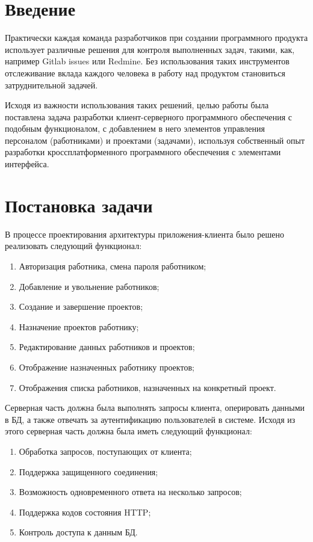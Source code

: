 \section*{Введение}
Практически каждая команда разработчиков при создании программного продукта использует различные решения для контроля выполненных задач,
такими, как, например Gitlab issues или Redmine.
Без использования таких инструментов отслеживание вклада каждого человека в работу над продуктом становиться затруднительной задачей.

Исходя из важности использования таких решений, целью работы была поставлена задача разработки клиент-серверного программного обеспечения
с подобным функционалом, с добавлением в него элементов управления персоналом (работниками) и проектами (задачами),
используя собственный опыт разработки кроссплатформенного программного обеспечения с элементами интерфейса.


\clearpage
\section{Постановка задачи}
В процессе проектирования архитектуры приложения-клиента было решено реализовать следующий функционал:
\begin{enumerate}
   \item Авторизация работника, смена пароля работником;
   \item Добавление и увольнение работников;
   \item Создание и завершение проектов;
   \item Назначение проектов работнику;
   \item Редактирование данных работников и проектов;
   \item Отображение назначенных работнику проектов;
   \item Отображения списка работников, назначенных на конкретный проект.
\end{enumerate}

Серверная часть должна была выполнять запросы клиента, оперировать данными в БД, а также отвечать за аутентификацию пользователей в системе.
Исходя из этого серверная часть должна была иметь следующий функционал:
\begin{enumerate}
   \item Обработка запросов, поступающих от клиента;
   \item Поддержка защищенного соединения;
   \item Возможность одновременного ответа на несколько запросов;
   \item Поддержка кодов состояния HTTP;
   \item Контроль доступа к данным БД.
\end{enumerate}


